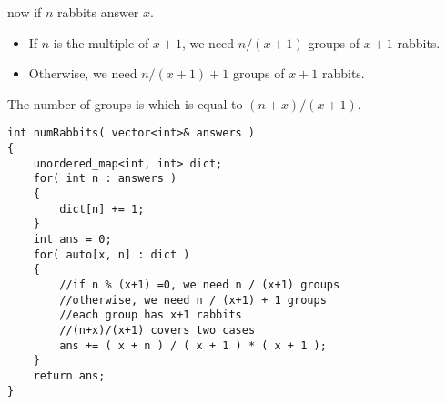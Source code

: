 now if $n$ rabbits answer $x$.

\begin{itemize}
\item If $n$ is the multiple of $x+1$, we need $n / (x + 1)$ groups of $x + 1$ rabbits.
\item Otherwise, we need $n / (x + 1) + 1$ groups of $x + 1$ rabbits.
\end{itemize}

The number of groups is  which is equal to $(n+x)/(x+1)$. 

\setcounter{lstlisting}{0}
\begin{lstlisting}[style=customc, caption={Count}]
int numRabbits( vector<int>& answers )
{
    unordered_map<int, int> dict;
    for( int n : answers )
    {
        dict[n] += 1;
    }
    int ans = 0;
    for( auto[x, n] : dict )
    {
        //if n % (x+1) =0, we need n / (x+1) groups
        //otherwise, we need n / (x+1) + 1 groups
        //each group has x+1 rabbits
        //(n+x)/(x+1) covers two cases
        ans += ( x + n ) / ( x + 1 ) * ( x + 1 );
    }
    return ans;
}
\end{lstlisting}


